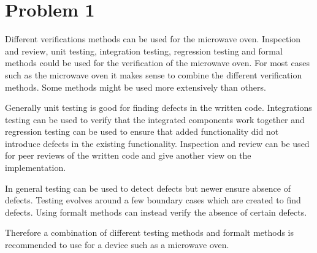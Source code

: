 \chapter{Problem 1}
\label{chp:one}


Different verifications methods can be used for the microwave oven. Inspection and review, unit testing, integration testing, regression testing and formal methods could be used for the verification of the microwave oven. For most cases such as the microwave oven it makes sense to combine the different verification methods. Some methods might be used more extensively than others. 

Generally unit testing is good for finding defects in the written code. Integrations testing can be used to verify that the integrated components work together and regression testing can be used to ensure that added functionality did not introduce defects in the existing functionality. Inspection and review can be used for peer reviews of the written code and give another view on the implementation.

In general testing can be used to detect defects but newer ensure absence of defects. Testing evolves around a few boundary cases which are created to find defects. Using formalt methods can instead verify the absence of certain defects. 

Therefore a combination of different testing methods and formalt methods is recommended to use for a device such as a microwave oven. 


